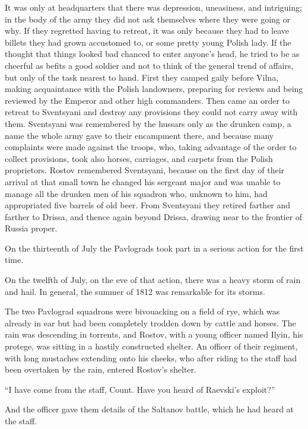 It was only at headquarters that there was depression,
uneasiness, and intriguing; in the body of the army they did not
ask themselves where they were going or why. If they regretted
having to retreat, it was only because they had to leave billets
they had grown accustomed to, or some pretty young Polish
lady. If the thought that things looked bad chanced to enter
anyone's head, he tried to be as cheerful as befits a good
soldier and not to think of the general trend of affairs, but
only of the task nearest to hand. First they camped gaily before
Vilna, making acquaintance with the Polish landowners, preparing
for reviews and being reviewed by the Emperor and other high
commanders. Then came an order to retreat to Sventsyani and
destroy any provisions they could not carry away with
them. Sventsyani was remembered by the hussars only as the
drunken camp, a name the whole army gave to their encampment
there, and because many complaints were made against the troops,
who, taking advantage of the order to collect provisions, took
also horses, carriages, and carpets from the Polish
proprietors. Rostov remembered Sventsyani, because on the first
day of their arrival at that small town he changed his sergeant
major and was unable to manage all the drunken men of his
squadron who, unknown to him, had appropriated five barrels of
old beer. From Sventsyani they retired farther and farther to
Drissa, and thence again beyond Drissa, drawing near to the
frontier of Russia proper.

On the thirteenth of July the Pavlograds took part in a serious
action for the first time.

On the twelfth of July, on the eve of that action, there was a
heavy storm of rain and hail. In general, the summer of 1812 was
remarkable for its storms.

The two Pavlograd squadrons were bivouacking on a field of rye,
which was already in ear but had been completely trodden down by
cattle and horses. The rain was descending in torrents, and
Rostov, with a young officer named Ilyin, his protege, was
sitting in a hastily constructed shelter. An officer of their
regiment, with long mustaches extending onto his cheeks, who
after riding to the staff had been overtaken by the rain, entered
Rostov's shelter.

``I have come from the staff, Count. Have you heard of Raevski's
exploit?''

And the officer gave them details of the Saltanov battle, which
he had heard at the staff.


